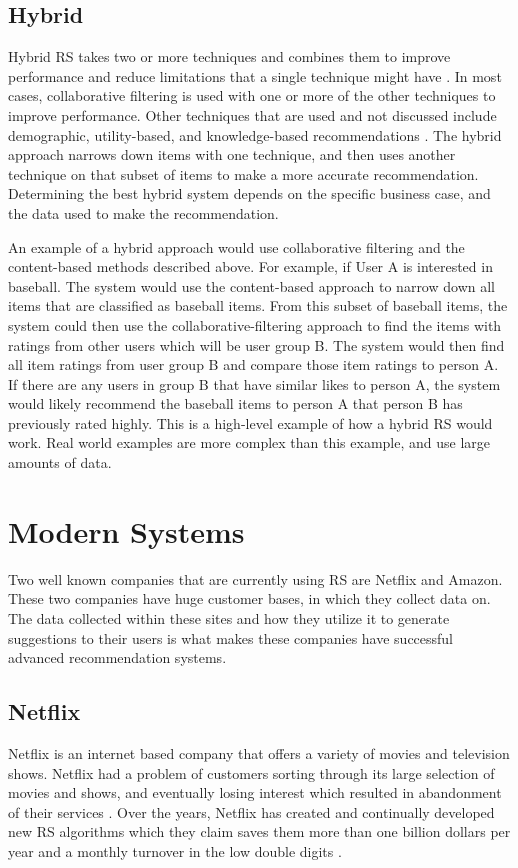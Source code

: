 \documentclass[sigconf]{acmart}
\begin{document}
\subsection{Hybrid}
Hybrid RS takes two or more techniques and combines them to improve performance and reduce limitations that a
single technique might have \cite{Burke2002}. In most cases, collaborative filtering is used with one or more
of the other techniques to improve performance. Other techniques that are used and not discussed include
demographic, utility-based, and knowledge-based recommendations \cite{Burke2002}. The hybrid approach narrows
down items with one technique, and then uses another technique on that subset of items to make a more accurate
recommendation. Determining the best hybrid system depends on the specific business case, and the data 
used to make the recommendation. 

An example of a hybrid approach would use collaborative filtering and the content-based methods described
above. For example, if User A is interested in baseball. The system would use the content-based approach to
narrow down all items that are classified as baseball items. From this subset of baseball items, the system
could then use the collaborative-filtering approach to find the items with ratings from other users which will
be user group B. The system would then find all item ratings from user group B and compare those item ratings
to person A. If there are any users in group B that have similar likes to person A, the system would likely
recommend the baseball items to person A that person B has previously rated highly. This is a high-level
example of how a hybrid RS would work. Real world examples are more complex than this example, and use large
amounts of data. 


\section{Modern Systems}
Two well known companies that are currently using RS are Netflix and Amazon. These two companies have huge
customer bases, in which they collect data on. The data collected within these sites and how they utilize it to
generate suggestions to their users is what makes these companies have successful advanced recommendation
systems. 

\subsection{Netflix}
Netflix is an internet based company that offers a variety of movies and television shows. Netflix had a
problem of customers sorting through its large selection of movies and shows, and eventually losing interest
which resulted in abandonment of their services \cite{Gomez-Uribe2015}. Over the years, Netflix has created and
continually developed new RS algorithms which they claim saves them more than one billion dollars per year and
a monthly turnover in the low double digits \cite{Gomez-Uribe2015}. 
\end{document}
